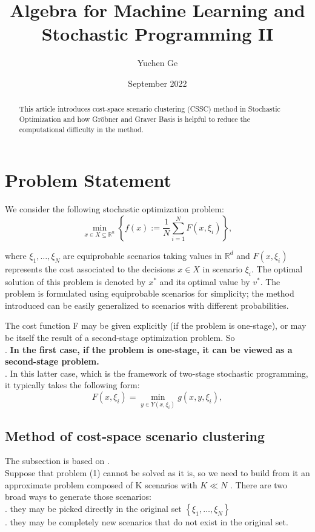 \documentclass{article}
\title{Algebra for Machine Learning and Stochastic Programming II}
\author{Yuchen Ge}
\date{September 2022}
\theoremstyle{plain}
\theoremstyle{definition}
\begin{document}
\maketitle
\tableofcontents
\newpage

\begin{abstract}
This article introduces cost-space scenario clustering (CSSC) method in Stochastic Optimization and how Gröbner and Graver Basis is helpful to reduce the computational difficulty in the method.
\end{abstract}
\section{Problem Statement}

We consider the following stochastic optimization problem:
\begin{equation}
\min _{x \in X \subseteq \mathbb{R}^{n}}\left\{f(x):=\frac{1}{N} \sum_{i=1}^{N} F\left(x, \xi_{i}\right)\right\},
\end{equation}

where  $\xi_{1}, \ldots, \xi_{N}$  are equiprobable scenarios taking values in  $\mathbb{R}^{d}$  and  $F\left(x, \xi_{i}\right)$  represents the cost associated to the decisions  $x \in X$  in scenario  $\xi_{i}$. The optimal solution of this problem is denoted by  $x^{*}$  and its optimal value by  $v^{*}$. The problem is formulated using equiprobable scenarios for simplicity; the method introduced can be easily generalized to scenarios with different probabilities.

The cost function  F  may be given explicitly (if the problem is one-stage), or may be itself the result of a second-stage optimization problem. So \\
. \textbf{In the first case, if the problem is one-stage, it can be viewed as a second-stage problem.} \\
. In this latter case, which is the framework of two-stage stochastic programming, it typically takes the following form:
$$F\left(x, \xi_{i}\right)=\min _{y \in Y\left(x, \xi_{i}\right)} g\left(x, y, \xi_{i}\right),$$
\subsection{Method of cost-space scenario clustering}
The subsection is based on \cite{ref1}.\\

Suppose that problem (1) cannot be solved as it is, so we need to build from it an approximate problem composed of  K  scenarios with  $K \ll N$ . There are two broad ways to generate those scenarios: \\
. they may be picked directly in the original set  $\left\{\xi_{1}, \ldots, \xi_{N}\right\}$ \\
. they may be completely new scenarios that do not exist in the original set. \\
\end{document}
